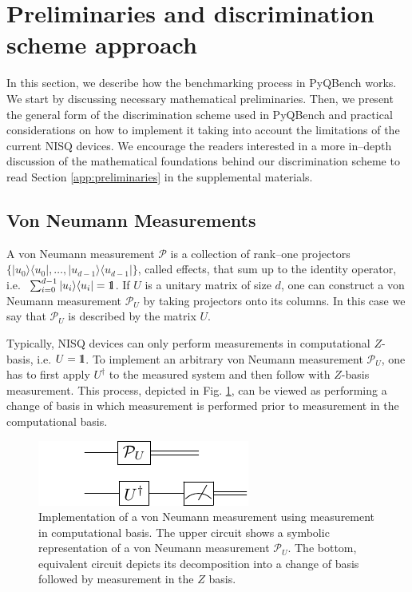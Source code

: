 \documentclass[preprint,12pt, a4paper, dvipsnames]{elsarticle}
\newcommand{\ket}[1]{\ensuremath{|#1\rangle}}
\newcommand{\bra}[1]{\ensuremath{\langle#1|}}
\newcommand{\ketbra}[2]{\ensuremath{\ket{#1}\bra{#2}}}
\newcommand{\proj}[1]{\ensuremath{\ketbra{#1}{#1}}}
\newcommand{\1}{{\rm 1\hspace{-0.9mm}l}}
\newcommand{\PP}{\mathcal{P}}
\theoremstyle{definition}
\begin{document}
\section{Preliminaries and discrimination scheme approach}

In this section, we describe how the benchmarking process in PyQBench works. We start by
discussing necessary mathematical preliminaries. Then, we present the general form of the
discrimination scheme used in PyQBench and practical considerations on how to implement it taking
into account the limitations of the current NISQ devices. We encourage the readers interested
in a more in--depth discussion of the mathematical foundations behind our discrimination scheme to read
Section \ref{app:preliminaries} in the supplemental materials.

\subsection{Von Neumann Measurements}\label{sec:maths}

A von Neumann measurement $\PP$ is a collection of rank--one projectors
$\{\proj{u_0}, \ldots, \proj{u_{d-1}}\}$, called effects, that sum up to the identity operator, i.e.
$ \, \, \sum_{i=0}^{d-1} \proj{u_i} = \1$. If $U$ is a unitary matrix of size $d$, one can construct
a von Neumann measurement $\PP_{U}$ by taking projectors onto its columns. In this case we say that
$\PP_{U}$ is described by the matrix $U$.

Typically, NISQ devices can only perform measurements in computational $Z$-basis, i.e. $U=\1$. To
implement an arbitrary von Neumann measurement $\PP_{U}$, one has to first apply $U^\dagger$ to the
measured system and then follow with $Z$-basis measurement. This process, depicted in Fig.
\ref{fig:vonneumann}, can be viewed as performing a change of basis in which measurement is
performed prior to measurement in the computational basis.

\begin{figure}[h!]
	\centering
	\includegraphics[scale=1.7]{pics/vonneuman}
	\caption{Implementation of a von Neumann measurement using measurement in computational basis.
	The upper circuit shows a symbolic representation of a von Neumann measurement $\PP_{U}$. The
	bottom, equivalent circuit depicts its decomposition into a change of basis followed
	by measurement in the $Z$ basis.}
	\label{fig:vonneumann}
\end{figure}
\end{document}
